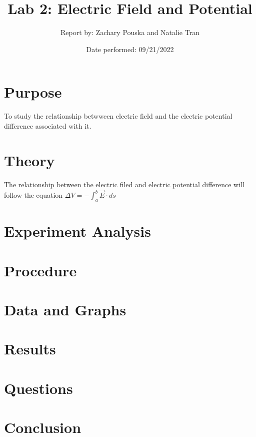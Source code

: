 \documentclass[titlepage]{article}
\begin{document}
\title{\textbf{Lab 2: Electric Field and Potential}}
\author{Report by: Zachary Pouska and  Natalie Tran}
\date{Date performed: 09/21/2022}

	\maketitle
	\section{Purpose}
	To study the relationship betwween electric field and the electric potential difference associated with it.
	\section{Theory}	
	The relationship between the electric filed and electric potential difference will follow the equation \(\Delta V = -\int_{a}^{b} \vec{E} \cdot ds\)
	\section{Experiment Analysis}
	\section{Procedure}
	\section{Data and Graphs}
	\section{Results}
	\section{Questions}
	\section{Conclusion}
	
\end{document}

